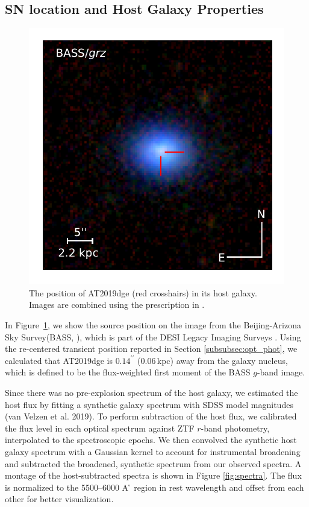 \documentclass[twocolumn]{aastex63}
\begin{document}
\begin{CJK*}{UTF8}{gbsn}
\subsection{SN location and Host Galaxy Properties}
\begin{figure}
	\centering
	\includegraphics[width=0.8\columnwidth]{figures/offset.pdf}
	\caption{The position of AT2019dge (red crosshairs) in its host galaxy.
		Images are combined using the prescription in \citet{Lupton2004}.
		\label{fig:offset}}
\end{figure}
In Figure~\ref{fig:offset}, we show the source position on the image from the Beijing-Arizona Sky 
Survey(BASS, \citealt{Zou2017}), which is part of the DESI Legacy Imaging Surveys \citep{Dey2019}. 
Using the re-centered transient position reported in Section \ref{subsubsec:opt_phot}, we calculated 
that AT2019dge is $0.14^{\prime\prime}$ (0.06\,kpc) away from the galaxy nucleus, which is defined to 
be the flux-weighted first 
moment of the BASS $g$-band image.

Since there was no pre-explosion spectrum of the host galaxy, we estimated the host flux 
by fitting a synthetic galaxy spectrum with SDSS model magnitudes (van Velzen et al. 2019). To 
perform subtraction of the host flux, we calibrated the flux level in each optical spectrum against ZTF 
$r$-band photometry, interpolated to the spectroscopic epochs. We then convolved the synthetic 
host galaxy spectrum with a Gaussian kernel to account for instrumental broadening and subtracted 
the broadened, synthetic spectrum from our observed spectra. A montage of the host-subtracted 
spectra is shown in Figure \ref{fig:spectra}. The flux is normalized to the 5500–6000 A ̊ region in rest 
wavelength and offset from each other for better visualization.


\end{CJK*}
\end{document}
